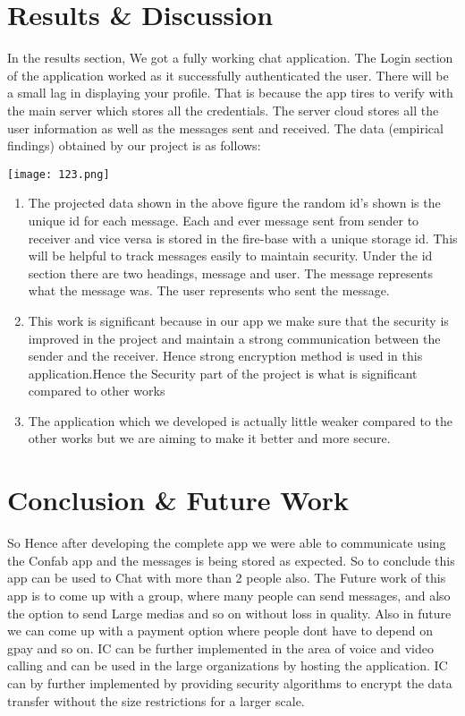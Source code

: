 \documentclass{article}
\begin{document}
\section{Results \& Discussion}
In the results section, We got a fully working chat application. The Login section of the application worked as it successfully authenticated the user. There will be a small lag in displaying your profile. That is because the app tires to verify with the main server which stores all the credentials. The server cloud stores all the user information as well as the messages sent and received.
The data (empirical findings) obtained by our project is as follows:
\begin{center}
\texttt{[image: 123.png]}
\end{center}
\begin{enumerate}
	\item The projected data shown in the above figure the random id's shown is the unique id for each message. Each and ever message sent from sender to receiver and vice versa is stored in the fire-base with a unique storage id. This will be helpful to track messages easily to maintain security. Under the id section there are two headings, message and user. The message represents what the message was. The user represents who sent the message.
	\item This work is significant because in our app we make sure that the security is improved in the project and maintain a strong communication between the sender and the receiver. Hence strong encryption method is used in this application.Hence the Security part of the project is what is significant compared to other works
	\item  The application which we developed is actually little weaker compared to the other works but we are aiming to make it better and more secure.
\end{enumerate}

\section{Conclusion \& Future Work}
So Hence after developing the complete app we were able to communicate using the Confab app and the messages is being stored as expected. So to conclude this app can be used to Chat with more than 2 people also. The Future work of this app is to come up with a group, where many people can send messages, and also the option to send Large medias and so on without loss in quality. Also in future we can come up with a payment option where people dont have to depend on gpay and so on. IC can be further implemented in the area of voice and
video calling and can be used in the large organizations by
hosting the application. IC can by further implemented by
providing security algorithms to encrypt the data transfer
without the size restrictions for a larger scale. 


\end{document}
